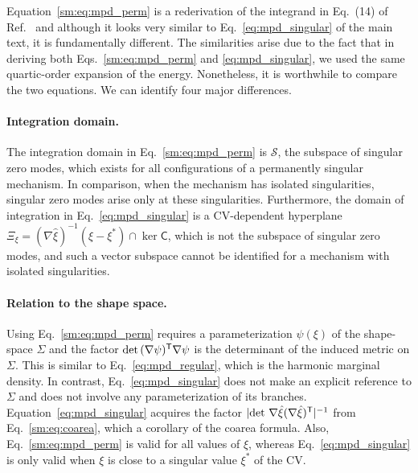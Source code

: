 Equation~\eqref{sm:eq:mpd_perm} is a rederivation of the integrand in Eq.~(14) of Ref.~\cite{kallus2017} and although it looks very similar to Eq.~\eqref{eq:mpd_singular} of the main text, it is fundamentally different.
The similarities arise due to the fact that in deriving both Eqs.~\eqref{sm:eq:mpd_perm} and \eqref{eq:mpd_singular}, we used the same quartic-order expansion of the energy.
Nonetheless, it is worthwhile to compare the two equations.
We can identify four major differences.

\paragraph{Integration domain.}
The integration domain in Eq.~\eqref{sm:eq:mpd_perm} is $\mathscr{S}$, the subspace of singular zero modes, which exists for all configurations of a permanently singular mechanism.
In comparison, when the mechanism has isolated singularities, singular zero modes arise only at these singularities.
Furthermore, the domain of integration in Eq.~\eqref{eq:mpd_singular} is a CV-dependent hyperplane $\Xi_{\xi} = (\nabla\hat{\xi})^{-1}(\xi - \xi^{*}) \cap \ker\mathsf{C}$, which is not the subspace of singular zero modes, and such a vector subspace cannot be identified for a mechanism with isolated singularities.

\paragraph{Relation to the shape space.}
Using Eq.~\eqref{sm:eq:mpd_perm} requires a parameterization $\psi(\xi)$ of the shape-space $\Sigma$ and the factor $\det\,(\nabla\psi)^\mathsf{T}\nabla\psi$ is the determinant of the induced metric on $\Sigma$.
This is similar to Eq.~\eqref{eq:mpd_regular}, which is the harmonic marginal density.
In contrast, Eq.~\eqref{eq:mpd_singular} does not make an explicit reference to $\Sigma$ and does not involve any parameterization of its branches.
Equation~\eqref{eq:mpd_singular} acquires the factor $\lvert\det\,{\nabla\hat{\xi}}(\nabla\hat{\xi})^\mathsf{T}\rvert^{-1}$ from Eq.~\eqref{sm:eq:coarea}, which a corollary of the coarea formula.
Also, Eq.~\eqref{sm:eq:mpd_perm} is valid for all values of $\xi$, whereas Eq.~\eqref{eq:mpd_singular} is only valid when $\xi$ is close to a singular value $\xi^{*}$ of the CV.

